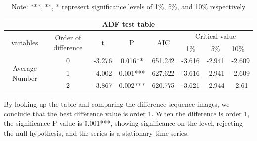 \documentclass[12pt]{article}  %
\begin{document}
\begin{table}[]
\centering
\begin{tabular}{|clclcccccc|}
\hline
\multicolumn{10}{|c|}{ADF test table} \\ \hline
\multicolumn{2}{|c|}{\multirow{3}{*}{variables}} &
  \multicolumn{2}{c|}{\multirow{3}{*}{Order of difference}} &
  \multicolumn{1}{c|}{\multirow{3}{*}{t}} &
  \multicolumn{1}{c|}{\multirow{3}{*}{P}} &
  \multicolumn{1}{c|}{\multirow{3}{*}{AIC}} &
  \multicolumn{3}{c|}{Critical value} \\ \cline{8-10} 
\multicolumn{2}{|c|}{} &
  \multicolumn{2}{c|}{} &
  \multicolumn{1}{c|}{} &
  \multicolumn{1}{c|}{} &
  \multicolumn{1}{c|}{} &
  \multicolumn{1}{c|}{\multirow{2}{*}{1\%}} &
  \multicolumn{1}{c|}{\multirow{2}{*}{5\%}} &
  \multicolumn{1}{l|}{\multirow{2}{*}{10\%}} \\
\multicolumn{2}{|c|}{} &
  \multicolumn{2}{c|}{} &
  \multicolumn{1}{c|}{} &
  \multicolumn{1}{c|}{} &
  \multicolumn{1}{c|}{} &
  \multicolumn{1}{c|}{} &
  \multicolumn{1}{c|}{} &
  \multicolumn{1}{l|}{} \\ \hline
\multicolumn{2}{|c|}{\multirow{3}{*}{Average   Number}} &
  \multicolumn{2}{c|}{0} &
  \multicolumn{1}{c|}{-3.276} &
  \multicolumn{1}{c|}{0.016**} &
  \multicolumn{1}{c|}{651.242} &
  \multicolumn{1}{c|}{-3.616} &
  \multicolumn{1}{c|}{-2.941} &
  -2.609 \\ \cline{3-10} 
\multicolumn{2}{|c|}{} &
  \multicolumn{2}{c|}{1} &
  \multicolumn{1}{c|}{-4.002} &
  \multicolumn{1}{c|}{0.001***} &
  \multicolumn{1}{c|}{627.622} &
  \multicolumn{1}{c|}{-3.616} &
  \multicolumn{1}{c|}{-2.941} &
  -2.609 \\ \cline{3-10} 
\multicolumn{2}{|c|}{} &
  \multicolumn{2}{c|}{2} &
  \multicolumn{1}{c|}{-3.867} &
  \multicolumn{1}{c|}{0.002***} &
  \multicolumn{1}{c|}{620.775} &
  \multicolumn{1}{c|}{-3.621} &
  \multicolumn{1}{c|}{-2.944} &
  -2.61 \\ \hline
\end{tabular}
\caption{Note: ***, **, * represent significance levels of 1\%, 5\%, and 10\% respectively}
\end{table}



By looking up the table and comparing the difference sequence images, we conclude that the best difference value is order 1. When the difference is order 1, the significance P value is 0.001***, showing significance on the level, rejecting the null hypothesis, and the series is a stationary time series.
\end{document}
